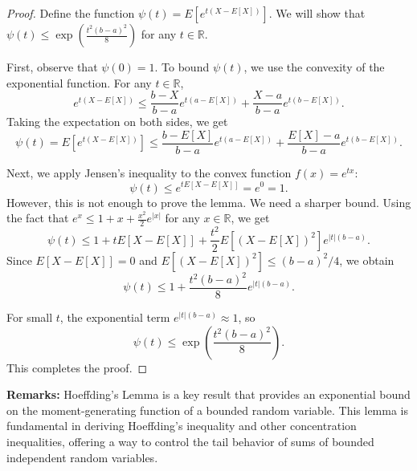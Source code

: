 \documentclass[11pt]{book} %
\begin{document}
\begin{proof}
    Define the function \( \psi(t) = E[e^{t(X - E[X])}] \). We will show that \( \psi(t) \leq \exp\left(\frac{t^2 (b - a)^2}{8}\right) \) for any \( t \in \mathbb{R} \).

    First, observe that \( \psi(0) = 1 \). To bound \( \psi(t) \), we use the convexity of the exponential function. For any \( t \in \mathbb{R} \),
    \begin{equation*}
        e^{t(X - E[X])} \leq \frac{b - X}{b - a} e^{t(a - E[X])} + \frac{X - a}{b - a} e^{t(b - E[X])}.
    \end{equation*}
    Taking the expectation on both sides, we get
    \begin{equation*}
        \psi(t) = E[e^{t(X - E[X])}] \leq \frac{b - E[X]}{b - a} e^{t(a - E[X])} + \frac{E[X] - a}{b - a} e^{t(b - E[X])}.
    \end{equation*}

    Next, we apply Jensen's inequality to the convex function \( f(x) = e^{tx} \):
    \begin{equation*}
        \psi(t) \leq e^{t E[X - E[X]]} = e^{0} = 1.
    \end{equation*}
    However, this is not enough to prove the lemma. We need a sharper bound. Using the fact that \( e^x \leq 1 + x + \frac{x^2}{2} e^{|x|} \) for any \( x \in \mathbb{R} \), we get
    \begin{equation*}
        \psi(t) \leq 1 + t E[X - E[X]] + \frac{t^2}{2} E[(X - E[X])^2] e^{|t|(b - a)}.
    \end{equation*}
    Since \( E[X - E[X]] = 0 \) and \( E[(X - E[X])^2] \leq (b - a)^2 / 4 \), we obtain
    \begin{equation*}
        \psi(t) \leq 1 + \frac{t^2 (b - a)^2}{8} e^{|t|(b - a)}.
    \end{equation*}

    For small \( t \), the exponential term \( e^{|t|(b - a)} \approx 1 \), so
    \begin{equation*}
        \psi(t) \leq \exp\left(\frac{t^2 (b - a)^2}{8}\right).
    \end{equation*}
    This completes the proof.
\end{proof}

\textbf{Remarks:}
Hoeffding's Lemma is a key result that provides an exponential bound on the moment-generating function of a bounded random variable. This lemma is fundamental in deriving Hoeffding's inequality and other concentration inequalities, offering a way to control the tail behavior of sums of bounded independent random variables.
\end{document}
